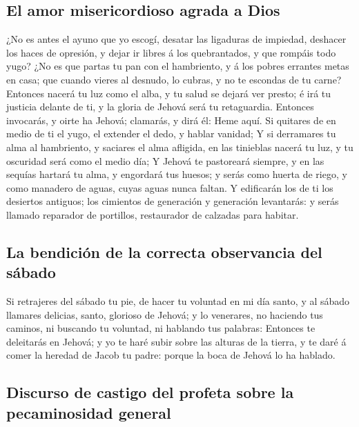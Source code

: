 \hypertarget{el-amor-misericordioso-agrada-a-dios}{%
\subsection{El amor misericordioso agrada a
Dios}\label{el-amor-misericordioso-agrada-a-dios}}

 ¿No es antes el ayuno que yo escogí, desatar las
ligaduras de impiedad, deshacer los haces de opresión, y dejar ir libres
á los quebrantados, y que rompáis todo yugo?  ¿No es que
partas tu pan con el hambriento, y á los pobres errantes metas en casa;
que cuando vieres al desnudo, lo cubras, y no te escondas de tu carne?
 Entonces nacerá tu luz como el alba, y tu salud se dejará
ver presto; é irá tu justicia delante de ti, y la gloria de Jehová será
tu retaguardia.  Entonces invocarás, y oirte ha Jehová;
clamarás, y dirá él: Heme aquí. Si quitares de en medio de ti el yugo,
el extender el dedo, y hablar vanidad;  Y si derramares
tu alma al hambriento, y saciares el alma afligida, en las tinieblas
nacerá tu luz, y tu oscuridad será como el medio día;  Y
Jehová te pastoreará siempre, y en las sequías hartará tu alma, y
engordará tus huesos; y serás como huerta de riego, y como manadero de
aguas, cuyas aguas nunca faltan.  Y edificarán los de ti
los desiertos antiguos; los cimientos de generación y generación
levantarás: y serás llamado reparador de portillos, restaurador de
calzadas para habitar.

\hypertarget{la-bendiciuxf3n-de-la-correcta-observancia-del-suxe1bado}{%
\subsection{La bendición de la correcta observancia del
sábado}\label{la-bendiciuxf3n-de-la-correcta-observancia-del-suxe1bado}}

 Si retrajeres del sábado tu pie, de hacer tu voluntad en
mi día santo, y al sábado llamares delicias, santo, glorioso de Jehová;
y lo venerares, no haciendo tus caminos, ni buscando tu voluntad, ni
hablando tus palabras:  Entonces te deleitarás en Jehová;
y yo te haré subir sobre las alturas de la tierra, y te daré á comer la
heredad de Jacob tu padre: porque la boca de Jehová lo ha hablado.

\hypertarget{discurso-de-castigo-del-profeta-sobre-la-pecaminosidad-general}{%
\subsection{Discurso de castigo del profeta sobre la pecaminosidad
general}\label{discurso-de-castigo-del-profeta-sobre-la-pecaminosidad-general}}

